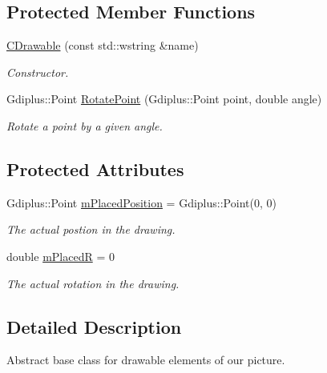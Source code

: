 \subsection*{Protected Member Functions}
\begin{DoxyCompactItemize}
\item 
\hyperlink{class_c_drawable_a2e153d7fd3a752139b0b87ea990a25fc}{C\+Drawable} (const std\+::wstring \&name)
\begin{DoxyCompactList}\small\item\em Constructor. \end{DoxyCompactList}\item 
Gdiplus\+::\+Point \hyperlink{class_c_drawable_aabf32ebc32a2dbe928bc9fa38bd82535}{Rotate\+Point} (Gdiplus\+::\+Point point, double angle)
\begin{DoxyCompactList}\small\item\em Rotate a point by a given angle. \end{DoxyCompactList}\end{DoxyCompactItemize}
\subsection*{Protected Attributes}
\begin{DoxyCompactItemize}
\item 
\hypertarget{class_c_drawable_abafce2c99898aac71bdb99ec2031d3a5}{Gdiplus\+::\+Point \hyperlink{class_c_drawable_abafce2c99898aac71bdb99ec2031d3a5}{m\+Placed\+Position} = Gdiplus\+::\+Point(0, 0)}\label{class_c_drawable_abafce2c99898aac71bdb99ec2031d3a5}

\begin{DoxyCompactList}\small\item\em The actual postion in the drawing. \end{DoxyCompactList}\item 
\hypertarget{class_c_drawable_a3b280b16b1a4a8c6e2588b1dc5574bda}{double \hyperlink{class_c_drawable_a3b280b16b1a4a8c6e2588b1dc5574bda}{m\+Placed\+R} = 0}\label{class_c_drawable_a3b280b16b1a4a8c6e2588b1dc5574bda}

\begin{DoxyCompactList}\small\item\em The actual rotation in the drawing. \end{DoxyCompactList}\end{DoxyCompactItemize}


\subsection{Detailed Description}
Abstract base class for drawable elements of our picture. 

